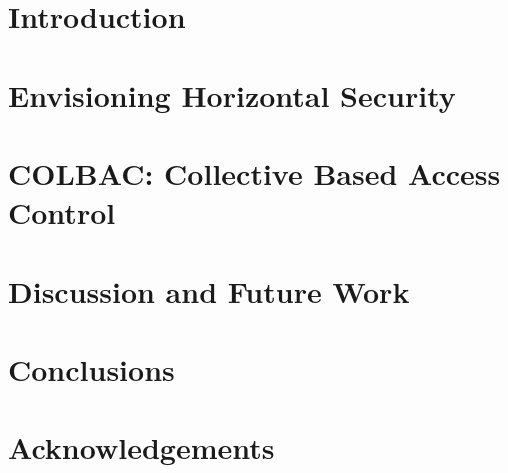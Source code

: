 \documentclass[sigconf, review, anonymous]{acmart}
\theoremstyle{mydef}
\begin{document}
\section{Introduction}
\label{sec:introduction}


\section{Envisioning Horizontal Security}
\label{sec:envisioning}


\section{COLBAC: Collective Based Access Control}
\label{sec:colbac}


%

%

\section{Discussion and Future Work}
\label{sec:discussion}


%

\section{Conclusions}
\label{sec:conclusion}
\balance


\section{Acknowledgements}




\end{document}
